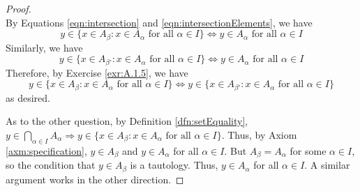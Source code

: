 \documentclass[../main.tex]{subfiles}
\begin{document}
\begin{enumerate}[ref={\thesection.\arabic*}]
\begin{proof}
\begin{equation*}
        \end{equation*}
        By Equations \ref{eqn:intersection} and \ref{eqn:intersectionElements}, we have
        \begin{equation*}
            y\in\{x\in A_\beta:x\in A_\alpha\text{ for all }\alpha\in I\} \Longleftrightarrow y\in A_\alpha\text{ for all }\alpha\in I
        \end{equation*}
        Similarly, we have
        \begin{equation*}
            y\in\{x\in A_{\beta'}:x\in A_\alpha\text{ for all }\alpha\in I\} \Longleftrightarrow y\in A_\alpha\text{ for all }\alpha\in I
        \end{equation*}
        Therefore, by Exercise \ref{exr:A.1.5}, we have 
        \begin{equation*}
            y\in\{x\in A_\beta:x\in A_\alpha\text{ for all }\alpha\in I\} \Longleftrightarrow y\in\{x\in A_{\beta'}:x\in A_\alpha\text{ for all }\alpha\in I\}
        \end{equation*}
        as desired.\par
        As to the other question, by Definition \ref{dfn:setEquality}, $y\in\bigcap_{\alpha\in I}A_\alpha \Longrightarrow y\in\{x\in A_\beta:x\in A_\alpha\text{ for all }\alpha\in I\}$. Thus, by Axiom \ref{axm:specification}, $y\in A_\beta$ and $y\in A_\alpha$ for all $\alpha\in I$. But $A_\beta=A_\alpha$ for some $\alpha\in I$, so the condition that $y\in A_\beta$ is a tautology. Thus, $y\in A_\alpha$ for all $\alpha\in I$. A similar argument works in the other direction.
    \end{proof}
\end{enumerate}
\end{document}
